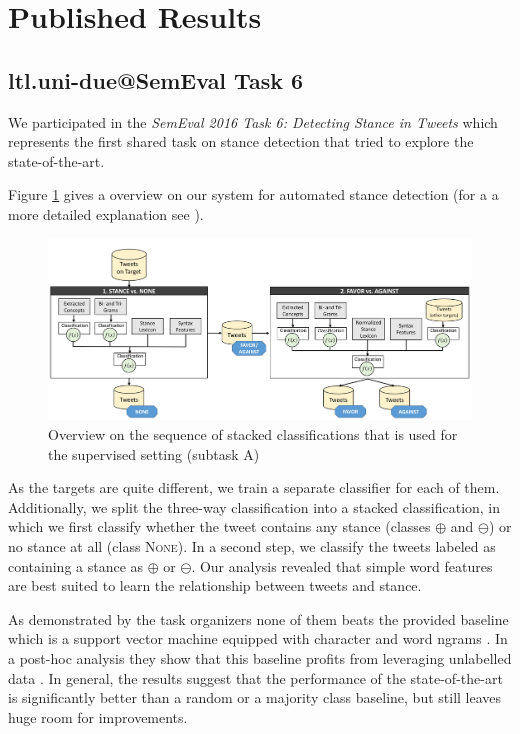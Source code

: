 \documentclass[11pt]{article}
\begin{document}
\section{Published Results}
\subsection{ltl.uni-due@SemEval Task 6 \cite{wojatzki2016stance}}
We participated in the \textit{\mbox{SemEval} 2016 Task 6: Detecting Stance in Tweets} which represents the first shared task on stance detection that tried to explore the state-of-the-art.

Figure \ref{fig:sketch1} gives a overview on our system for automated stance detection (for a a more detailed explanation see ).

\begin{figure}
  \centering
  \includegraphics[scale=0.25]{figures/stance_skizze_new.png}
  \caption{Overview on the sequence of stacked classifications that is used for the supervised setting (subtask A)}
  \label{fig:sketch1}
\end{figure}


As the targets are quite different, we train a separate classifier for each of them. 
Additionally, we split the three-way classification into a stacked classification, in which we first classify whether the tweet contains any stance (classes $\oplus$ and $\ominus$) or no stance at all (class \textsc{None}).
In a second step, we classify the tweets labeled as containing a stance as $\oplus$ or $\ominus$.
Our analysis revealed that simple word features are best suited to learn the relationship between tweets and stance.

As demonstrated by the task organizers none of them beats the provided baseline which is  a support vector machine equipped with character and word ngrams \cite{StanceSemEval2016}.
In a post-hoc analysis they show that this baseline profits from leveraging unlabelled data \cite{mohammad2016stance}.
In general, the results suggest that the performance of the state-of-the-art is significantly better than a random or a majority class baseline, but still leaves huge room for improvements.
\end{document}
